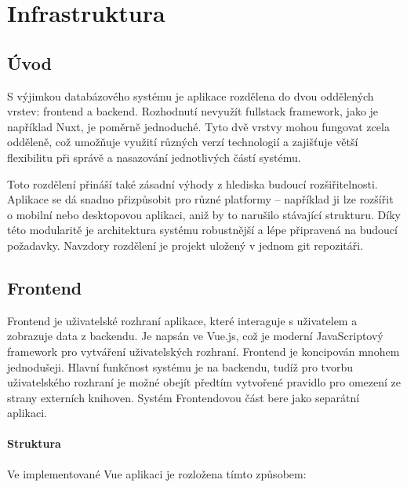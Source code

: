 \chapter{Infrastruktura}

\section{Úvod}
S výjimkou databázového systému je aplikace rozdělena do dvou oddělených vrstev: frontend a backend. Rozhodnutí nevyužít fullstack framework, jako je například Nuxt\cite{nuxtIntroductionStarted}, je poměrně jednoduché. Tyto dvě vrstvy mohou fungovat zcela odděleně, což umožňuje využití různých verzí technologií a zajišťuje větší flexibilitu při správě a nasazování jednotlivých částí systému.

Toto rozdělení přináší také zásadní výhody z hlediska budoucí rozšiřitelnosti. Aplikace se dá snadno přizpůsobit pro různé platformy – například ji lze rozšířit o mobilní nebo desktopovou aplikaci, aniž by to narušilo stávající strukturu. Díky této modularitě je architektura systému robustnější a lépe připravená na budoucí požadavky. Navzdory rozdělení je projekt uložený v jednom git repozitáři.





\section{Frontend}
Frontend je uživatelské rozhraní aplikace, které interaguje s uživatelem a zobrazuje data z backendu. Je napsán ve Vue.js, což je moderní JavaScriptový framework pro vytváření uživatelských rozhraní. Frontend je koncipován mnohem jednodušeji. Hlavní funkčnost systému je na backendu, tudíž pro tvorbu uživatelského rozhraní je možné obejít předtím vytvořené pravidlo pro omezení ze strany externích knihoven. Systém Frontendovou část bere jako separátní aplikaci.

\subsubsection{Struktura}
Ve implementované Vue aplikaci je rozložena tímto způsobem:



